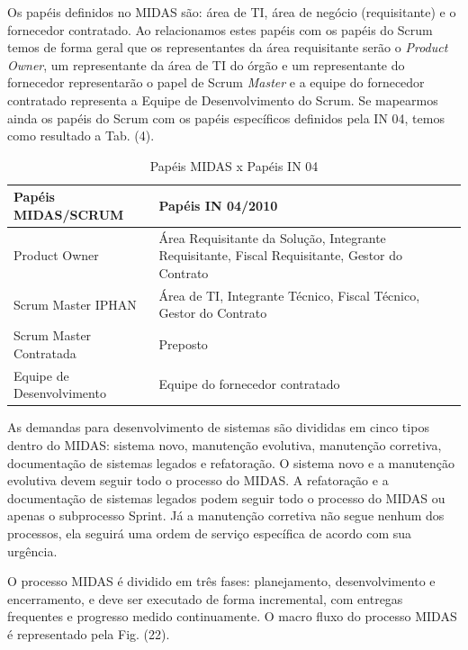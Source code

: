 \begin{anexosenv}
Os papéis definidos no MIDAS são: área de TI, área de negócio (requisitante) e o fornecedor contratado. Ao relacionamos estes papéis com os papéis do Scrum temos de forma geral que os representantes da área requisitante serão o \textit{Product Owner}, um representante da área de TI do órgão e um representante do fornecedor representarão o papel de Scrum \textit{Master} e a equipe do fornecedor contratado representa a Equipe de Desenvolvimento do Scrum. Se mapearmos ainda os papéis do Scrum com os papéis específicos definidos pela IN 04, temos como resultado a Tab. (4). 

\begin{table}[H]
\center
\footnotesize
\begin{tabular}{|p{6cm}|p{6cm}|}
  \hline
   \textbf{Papéis MIDAS/SCRUM} & \textbf{Papéis IN 04/2010}\\
    \hline
   Product Owner & Área Requisitante da Solução, Integrante Requisitante, Fiscal Requisitante, Gestor do Contrato\\
   \hline    
    Scrum Master IPHAN & Área de TI, Integrante Técnico, Fiscal Técnico, Gestor do Contrato\\
    \hline
   Scrum Master Contratada & Preposto\\
   \hline
    Equipe de Desenvolvimento & Equipe do fornecedor contratado\\
   \hline
\end{tabular}
\caption{Papéis MIDAS x Papéis IN 04}
\end{table}

As demandas para desenvolvimento de sistemas são divididas em cinco tipos dentro do MIDAS: sistema novo, manutenção evolutiva, manutenção corretiva, documentação de sistemas legados e refatoração.  O sistema novo e a manutenção evolutiva devem seguir todo o processo do MIDAS. A refatoração e a documentação de sistemas legados podem seguir todo o processo do MIDAS ou apenas o subprocesso Sprint. Já a manutenção corretiva não segue nenhum dos processos, ela seguirá uma ordem de serviço específica de acordo com sua urgência.

O processo MIDAS é dividido em três fases: planejamento, desenvolvimento e encerramento, e deve ser executado de forma incremental, com entregas frequentes e progresso medido continuamente. O macro fluxo do processo MIDAS é representado pela Fig. (22).


\end{anexosenv}
